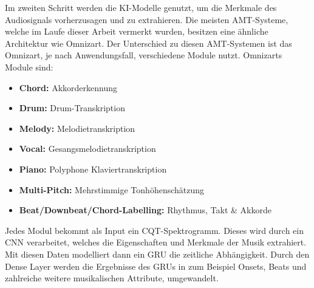 Im zweiten Schritt werden die KI-Modelle genutzt, um die Merkmale des Audiosignals vorherzusagen und zu extrahieren.
Die meisten AMT-Systeme, welche im Laufe dieser Arbeit vermerkt wurden, besitzen eine ähnliche Architektur wie Omnizart.
\cite{hawthorne2017onsets}
Der Unterschied zu diesen AMT-Systemen ist das Omnizart, je nach Anwendungsfall, verschiedene Module nutzt.
Omnizarts Module sind:
\begin{itemize}
    \item \textbf{Chord:} Akkorderkennung
    \item \textbf{Drum:} Drum-Transkription
    \item \textbf{Melody:} Melodietranskription
    \item \textbf{Vocal:} Gesangsmelodietranskription
    \item \textbf{Piano:} Polyphone Klaviertranskription
    \item \textbf{Multi-Pitch:} Mehrstimmige Tonhöhenschätzung
    \item \textbf{Beat/Downbeat/Chord-Labelling:} Rhythmus, Takt \& Akkorde
\end{itemize}
Jedes Modul bekommt als Input ein CQT-Spektrogramm.
Dieses wird durch ein CNN verarbeitet, welches die Eigenschaften und Merkmale der Musik extrahiert.
Mit diesen Daten modelliert dann ein GRU die zeitliche Abhängigkeit.
Durch den Dense Layer werden die Ergebnisse des GRUs in zum Beispiel Onsets,
Beats und zahlreiche weitere musikalischen Attribute, umgewandelt.

